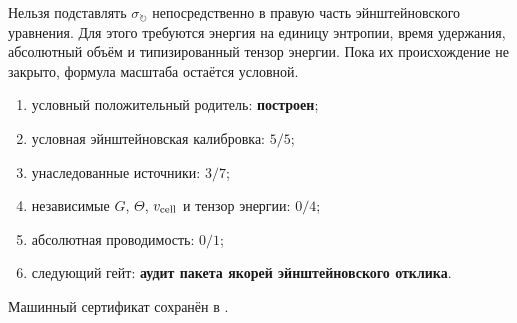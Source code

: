 \begin{nogocriterion}
Нельзя подставлять $\sigma_\circlearrowright$ непосредственно в правую часть
эйнштейновского уравнения. Для этого требуются энергия на единицу энтропии,
время удержания, абсолютный объём и типизированный тензор энергии. Пока их
происхождение не закрыто, формула масштаба остаётся условной.
\end{nogocriterion}

\begin{protocol}\begin{enumerate}
\item условный положительный родитель: \textbf{построен};
\item условная эйнштейновская калибровка: \textbf{$5/5$};
\item унаследованные источники: \textbf{$3/7$};
\item независимые $G$, $\Theta$, $v_{\rm cell}$ и тензор энергии:
\textbf{$0/4$};
\item абсолютная проводимость: \textbf{$0/1$};
\item следующий гейт: \textbf{аудит пакета якорей эйнштейновского отклика}.
\end{enumerate}\end{protocol}

Машинный сертификат сохранён в
.